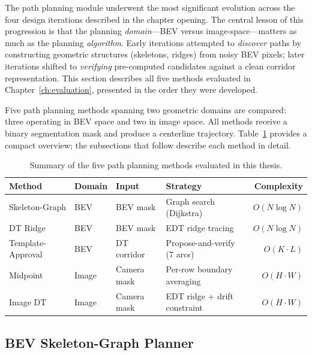 \documentclass[12pt,letterpaper,oneside]{report}
\begin{document}
The path planning module underwent the most significant evolution across the four design iterations described in the chapter opening. The central lesson of this progression is that the planning \emph{domain}---BEV versus image-space---matters as much as the planning \emph{algorithm}. Early iterations attempted to \emph{discover} paths by constructing geometric structures (skeletons, ridges) from noisy BEV pixels; later iterations shifted to \emph{verifying} pre-computed candidates against a clean corridor representation. This section describes all five methods evaluated in Chapter~\ref{ch:evaluation}, presented in the order they were developed.

Five path planning methods spanning two geometric domains are compared: three operating in BEV space and two in image space. All methods receive a binary segmentation mask and produce a centerline trajectory.  Table~\ref{tab:planner_summary} provides a compact overview; the subsections that follow describe each method in detail.

\begin{table}[h]
\centering
\caption{Summary of the five path planning methods evaluated in this thesis.}
\label{tab:planner_summary}
\begin{tabular}{llllr}
\toprule
Method & Domain & Input & Strategy & Complexity \\
\midrule
Skeleton-Graph   & BEV   & BEV mask        & Graph search (Dijkstra)    & $O(N \log N)$ \\
DT Ridge         & BEV   & BEV mask        & EDT ridge tracing          & $O(N \log N)$ \\
Template-Approval& BEV   & DT corridor     & Propose-and-verify (7 arcs)& $O(K \cdot L)$ \\
Midpoint         & Image & Camera mask     & Per-row boundary averaging & $O(H \cdot W)$ \\
Image DT         & Image & Camera mask     & EDT ridge + drift constraint& $O(H \cdot W)$ \\
\bottomrule
\end{tabular}
\end{table}


\subsection{BEV Skeleton-Graph Planner}
\label{sec:skeleton_planner}
\end{document}
